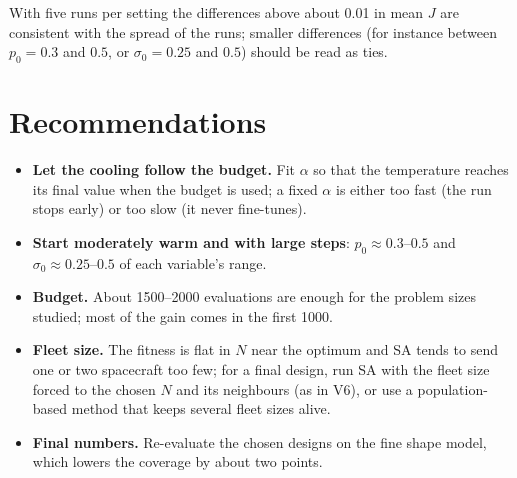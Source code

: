 With five runs per setting the differences above about 0.01 in mean $J$ are consistent with the spread
of the runs; smaller differences (for instance between $p_0=0.3$ and $0.5$, or $\sigma_0=0.25$ and
$0.5$) should be read as ties.

\section{Recommendations}
\begin{itemize}
\item \textbf{Let the cooling follow the budget.} Fit $\alpha$ so that the temperature reaches its final
value when the budget is used; a fixed $\alpha$ is either too fast (the run stops early) or too slow
(it never fine-tunes).
\item \textbf{Start moderately warm and with large steps}: $p_0\approx0.3$--$0.5$ and
$\sigma_0\approx0.25$--$0.5$ of each variable's range.
\item \textbf{Budget.} About 1500--2000 evaluations are enough for the problem sizes studied; most of
the gain comes in the first 1000.
\item \textbf{Fleet size.} The fitness is flat in $N$ near the optimum and \ac{SA} tends to send one or two
spacecraft too few; for a final design, run \ac{SA} with the fleet size forced to the chosen $N$ and
its neighbours (as in V6), or use a population-based method that keeps several fleet sizes alive.
\item \textbf{Final numbers.} Re-evaluate the chosen designs on the fine shape model, which lowers the
coverage by about two points.
\end{itemize}
